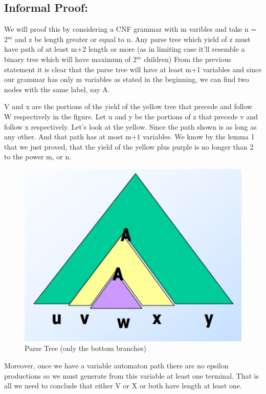 \documentclass{report}
\begin{document}
\subsection{Informal Proof:}
We will proof this by considering a CNF grammar with m varibles and take n = 2$^m$ and z be length greater or equal to n. Any parse tree which yield of z must have path of at least m+2 length or more (as in limiting case it'll resemble a binary tree which will have maximum of 2$^m$ children) From the previous statement it is clear that the parse tree will have at least m+1 variables and since our grammar has only m variables as stated in the beginning,  we can find two nodes with the same label, say A. \\
\par
V and x are the portions of the yield of the yellow tree that precede and
follow W respectively in the figure. Let u and y be the portions of z that precede v and follow x respectively. Let's look at the yellow. Since the path shown is as long as any other. And that path has at most m+1 variables. We know by the lemma 1 that we just proved, that the yield of the yellow plus purple is no longer than 2 to the power m, or n. \\ 
\begin{figure}[h]
    \centering
    \includegraphics[scale=0.5]{pump1.png}
    \caption{Parse Tree (only the bottom branches)}
    \label{fig:my_label}
\end{figure}
\par
Moreover, once we have a variable automaton path there are no epsilon productions so
we must generate from this variable at least one terminal. That is all we need to conclude that either V or X or both have length at least one.\\
\end{document}
